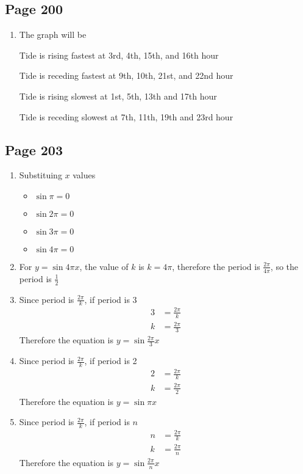 \documentclass{article}
\newenvironment{solutions}[1]
{\subsection*{#1}
 \begin{enumerate}[leftmargin=1.5em]}
{\end{enumerate}}
\newcommand{\solution}{\item}
\begin{document}
\begin{solutions}{Page 200}
\solution
The graph will be 


Tide is rising fastest at 3rd, 4th, 15th, and 16th hour 

Tide is receding fastest at 9th, 10th, 21st, and 22nd hour 

Tide is rising slowest at 1st, 5th, 13th and 17th hour 

Tide is receding slowest at 7th, 11th, 19th and 23rd hour 

\end{solutions}

\begin{solutions}{Page 203}
\solution
Substituing $x$ values
\begin{itemize}
    \item $\sin \pi=0$
    \item $\sin 2\pi=0$
    \item $\sin 3\pi=0$
    \item $\sin 4\pi=0$
\end{itemize}

\solution
For $y=\sin 4\pi x$, the value of $k$ is $k=4\pi$, therefore the period is $\frac{2\pi}{4\pi}$, so the period is $\frac{1}{2}$

\solution
Since period is $\frac{2\pi}{k}$, if period is 3
\begin{align*}
    3 &= \frac{2\pi}{k}\\
    k &= \frac{2\pi}{3}
\end{align*}
Therefore the equation is $y=\sin \frac{2\pi}{3}x$

\solution
Since period is $\frac{2\pi}{k}$, if period is 2
\begin{align*}
    2 &= \frac{2\pi}{k}\\
    k &= \frac{2\pi}{2}
\end{align*}
Therefore the equation is $y=\sin \pi x$

\solution
Since period is $\frac{2\pi}{k}$, if period is $n$
\begin{align*}
    n &= \frac{2\pi}{k}\\
    k &= \frac{2\pi}{n}
\end{align*}
Therefore the equation is $y=\sin \frac{2\pi}{n} x$
\end{solutions}
\end{document}
